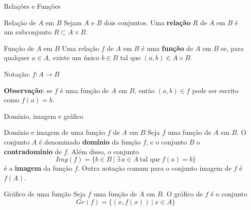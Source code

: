 \begin{frame}[fragile]{Relações e Funções}

    \begin{block}{Relação de $A$ em $B$}
        Sejam $A$ e $B$ dois conjuntos. Uma \textbf{relação} $R$ de $A$ em $B$ é um subconjunto 
            $R\subset A\times B$.
    \end{block}

    \vspace{0.1in}

    \begin{block}{Função de $A$ em $B$}
        Uma relação $f$ de $A$ em $B$ é uma \textbf{função} de $A$ em $B$ se, para qualquer 
            $a\in A$, existe um único $b\in B$ tal que $(a, b)\in A\times B$. 

        Notação: $f: A\to B$
    \end{block}

    \vspace{0.1in}

    \textbf{Observação}: se $f$ é uma função de $A$ em $B$, então $(a, b)\in f$ pode ser 
        escrito como $f(a) = b$.
        
\end{frame}

\begin{frame}[fragile]{Domínio, imagem e gráfico}

    \begin{block}{Domínio e imagem de uma função $f$ de $A$ em $B$}
        Seja $f$ uma função de $A$ em $B$. O conjunto $A$ é denominado \textbf{domínio} da
            função $f$, e o conjunto $B$ o \textbf{contradomínio} de $f$. Além disso, o conjunto
        \[
            Img(f) = \lbrace b \in B\ |\ \exists\, a\in A\ \mbox{tal que}\ f(a) = b \rbrace
        \]
        é a \textbf{imagem} da função $f$. Outra notação comum para o conjunto imagem de $f$ é 
        $f(A)$.
    \end{block}

    \vspace{0.05in}

    \begin{block}{Gráfico de uma função}
        Seja $f$ uma função de $A$ em $B$. O gráfico de $f$ é o conjunto
        \[
            Gr(f) = \lbrace (x, f(x))\ |\ x\in A\rbrace
        \]
    \end{block}

\end{frame}

